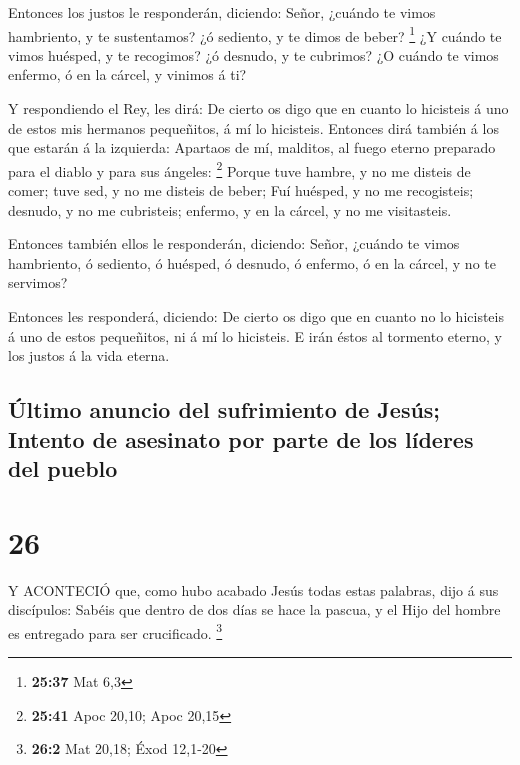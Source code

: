  Entonces los justos le responderán, diciendo: Señor,
¿cuándo te vimos hambriento, y te sustentamos? ¿ó sediento, y te dimos
de beber? \footnote{\textbf{25:37} Mat 6,3}  ¿Y cuándo te
vimos huésped, y te recogimos? ¿ó desnudo, y te cubrimos? 
¿O cuándo te vimos enfermo, ó en la cárcel, y vinimos á ti?

 Y respondiendo el Rey, les dirá: De cierto os digo que en
cuanto lo hicisteis á uno de estos mis hermanos pequeñitos, á mí lo
hicisteis.  Entonces dirá también á los que estarán á la
izquierda: Apartaos de mí, malditos, al fuego eterno preparado para el
diablo y para sus ángeles: \footnote{\textbf{25:41} Apoc 20,10; Apoc
  20,15}  Porque tuve hambre, y no me disteis de comer;
tuve sed, y no me disteis de beber;  Fuí huésped, y no me
recogisteis; desnudo, y no me cubristeis; enfermo, y en la cárcel, y no
me visitasteis.

 Entonces también ellos le responderán, diciendo: Señor,
¿cuándo te vimos hambriento, ó sediento, ó huésped, ó desnudo, ó
enfermo, ó en la cárcel, y no te servimos?

 Entonces les responderá, diciendo: De cierto os digo que
en cuanto no lo hicisteis á uno de estos pequeñitos, ni á mí lo
hicisteis.  E irán éstos al tormento eterno, y los justos á
la vida eterna.

\hypertarget{uxfaltimo-anuncio-del-sufrimiento-de-jesuxfas-intento-de-asesinato-por-parte-de-los-luxedderes-del-pueblo}{%
\subsection{Último anuncio del sufrimiento de Jesús; Intento de
asesinato por parte de los líderes del
pueblo}\label{uxfaltimo-anuncio-del-sufrimiento-de-jesuxfas-intento-de-asesinato-por-parte-de-los-luxedderes-del-pueblo}}

\hypertarget{section-25}{%
\section{26}\label{section-25}}

 Y ACONTECIÓ que, como hubo acabado Jesús todas estas
palabras, dijo á sus discípulos:  Sabéis que dentro de dos
días se hace la pascua, y el Hijo del hombre es entregado para ser
crucificado. \footnote{\textbf{26:2} Mat 20,18; Éxod 12,1-20}

